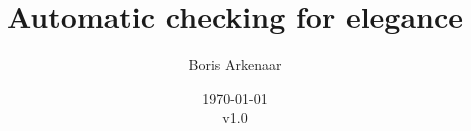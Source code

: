 \documentclass{article}
\begin{document}
 

\title{Automatic checking for elegance}
\author{Boris Arkenaar}
\date{\today\\v1.0}
\maketitle 





\end{document}
